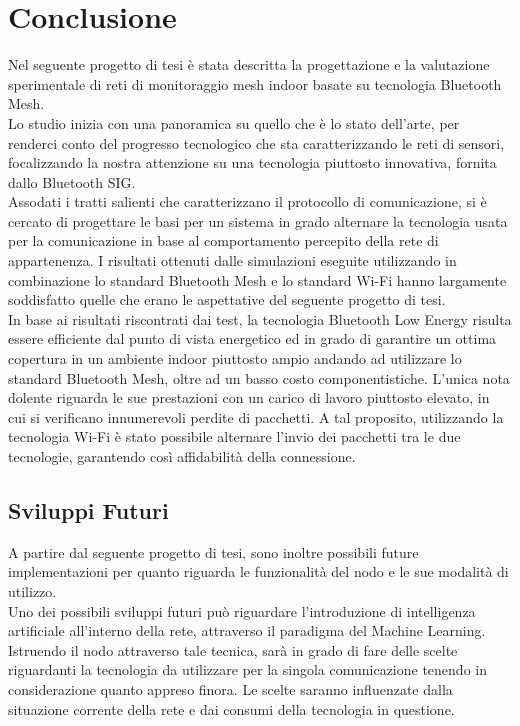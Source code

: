 \chapter{Conclusione}
\label{ch:conclusione}
Nel seguente progetto di tesi è stata descritta la progettazione e la valutazione sperimentale di reti di monitoraggio mesh indoor basate su tecnologia Bluetooth Mesh.\\
Lo studio inizia con una panoramica su quello che è lo stato dell’arte, per renderci conto del progresso tecnologico che sta caratterizzando le reti di sensori, focalizzando la nostra attenzione su una tecnologia piuttosto innovativa, fornita dallo Bluetooth SIG.\\
Assodati i tratti salienti che caratterizzano il protocollo di comunicazione, si è cercato di progettare le basi per un sistema in grado alternare la tecnologia usata per la comunicazione in base al comportamento percepito della rete di appartenenza.  
I risultati ottenuti dalle simulazioni eseguite utilizzando in combinazione lo standard Bluetooth Mesh e lo standard Wi-Fi hanno largamente soddisfatto quelle che erano le aspettative del seguente progetto di tesi.\\
In base ai risultati riscontrati dai test, la tecnologia Bluetooth Low Energy risulta essere efficiente dal punto di vista energetico ed in grado di garantire un ottima copertura in un ambiente indoor piuttosto ampio andando ad utilizzare lo standard Bluetooth Mesh, oltre ad un basso costo componentistiche. L'unica nota dolente riguarda le sue prestazioni con un carico di lavoro piuttosto elevato, in cui si verificano innumerevoli perdite di pacchetti. A tal proposito, utilizzando la tecnologia Wi-Fi è stato possibile alternare l'invio dei pacchetti tra le due tecnologie, garantendo così affidabilità della connessione.\\

\section{Sviluppi Futuri}
A partire dal seguente progetto di tesi, sono inoltre possibili future implementazioni per quanto riguarda le funzionalità del nodo e le sue modalità di utilizzo.\\
Uno dei possibili sviluppi futuri può riguardare l'introduzione di intelligenza artificiale all'interno della rete, attraverso il paradigma del Machine Learning. Istruendo il nodo attraverso tale tecnica, sarà in grado di fare delle scelte riguardanti la tecnologia da utilizzare per la singola comunicazione tenendo in considerazione quanto appreso finora. Le scelte saranno influenzate dalla situazione corrente della rete e dai consumi della tecnologia in questione.
